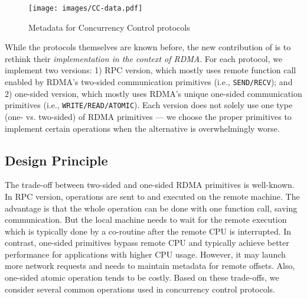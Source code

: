 \begin{figure}[t]
    \centering
    \vspace{-1mm}
    \texttt{[image: images/CC-data.pdf]}
    \vspace{-5mm}
    \caption{Metadata for Concurrency Control protocols}
    \vspace{-8mm}
    \label{fig:metadata}
\end{figure}

While the protocols themselves are known before, 
the new contribution of 
\projectname is to rethink their {\em implementation in the context of RDMA}. 
For each protocol, we implement two versions:
1) RPC version, which mostly uses remote function call enabled by RDMA's two-sided communication primitives (i.e., \texttt{SEND/RECV}); 
and 2) one-sided version, which mostly uses RDMA's unique 
one-sided communication primitives (i.e., \texttt{WRITE/READ/ATOMIC}). 
Each version does not solely use
one type (one- vs. two-sided) of RDMA primitives
--- we choose the proper primitives
to implement certain operations when the alternative
is overwhelmingly worse. 


\subsection{Design Principle}
 
The trade-off between two-sided and one-sided 
RDMA primitives is well-known. 
In RPC version, 
operations are sent to and executed on the
remote machine. 
The advantage is that the whole operation can be done with one function call, saving communication.  
But the local machine needs to 
wait for the remote execution which is typically done by
a co-routine after the remote CPU is interrupted.
In contrast, one-sided primitives 
bypass remote CPU and typically achieve
better performance for 
applications with higher CPU usage.
However, it may launch more network 
requests and needs to maintain metadata for remote offsets. 
Also, one-sided atomic
operation tends to be costly. 
Based on these trade-offs, we consider several common operations used in concurrency control protocols. 


